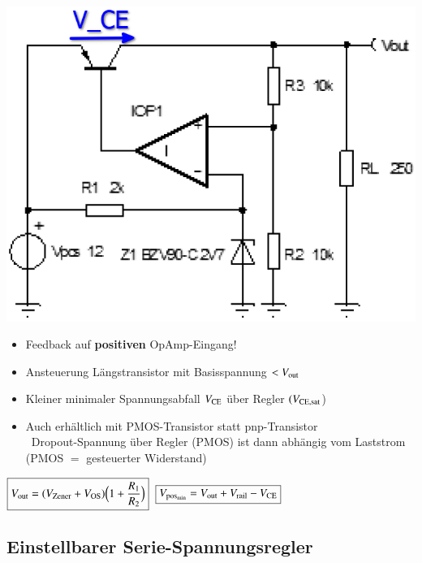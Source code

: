 \begin{minipage}[c]{0.25\columnwidth}
    \includegraphics[width=\columnwidth]{images/ldo_pnp_transistor.png}
\end{minipage}
\hfill
\begin{minipage}[c]{0.74\columnwidth}
    \begin{itemize}
        \item Feedback auf \textbf{positiven} OpAmp-Eingang!\\
        \item Ansteuerung Längstransistor mit Basisspannung $< V_{\rm out}$
        \item Kleiner minimaler Spannungsabfall $V_{\rm CE}$ über Regler $(V_{\rm CE,sat}$)
        \item Auch erhältlich mit PMOS-Transistor statt pnp-Transistor\\
            \textrightarrow\ Dropout-Spannung über Regler (PMOS) ist dann 
            abhängig vom Laststrom (PMOS $=$ gesteuerter Widerstand)
    \end{itemize}
\end{minipage}
$ \boxed{ V_{\rm out} = (V_{\rm Zener} + V_{\rm OS}) \Big( 1 + \frac{R_1}{R_2} \Big) }$
$ \boxed{V_{\rm pos_{min}} = V_{\rm out} + V_{\rm rail} - V_{\rm CE}}$\\

\subsection{Einstellbarer Serie-Spannungsregler}


